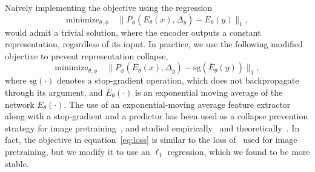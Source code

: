\documentclass[twocolumn]{fairmeta}
\theoremstyle{plain}
\theoremstyle{definition}
\theoremstyle{remark}
\begin{document}
Naively implementing the objective using the regression
\[
    \text{minimize}_{\theta,\phi}\quad \lVert P_\phi(E_\theta(x), \Delta_y) - E_\theta(y) \rVert_1,
\]
would admit a trivial solution, where the encoder outputs a constant representation, regardless of its input.
In practice, we use the following modified objective to prevent representation collapse,
\begin{equation}
    \label{eq:loss}
    \text{minimize}_{\theta,\phi}\quad \rVert P_\phi(E_\theta(x), \Delta_y) - \text{sg}(\overline{E}_\theta(y)) \lVert_1,
\end{equation}
where $\text{sg}(\cdot)$ denotes a stop-gradient operation, which does not backpropagate through its argument, and $\overline{E}_\theta(\cdot)$ is an exponential moving average of the network $E_\theta(\cdot)$.
The use of an exponential-moving average feature extractor along with a stop-gradient and a predictor has been used as a collapse prevention strategy for image pretraining~\citep{grill2020bootstrap}, and studied empirically~\citep{xie2021simmim} and theoretically~\citep{tian2021understanding}.
In fact, the objective in equation~\eqref{eq:loss} is  similar to the loss of~\citet{assran2023self} used for image pretraining, but we modify it to use an $\ell_1$ regression, which we found to be more stable.
\end{document}
